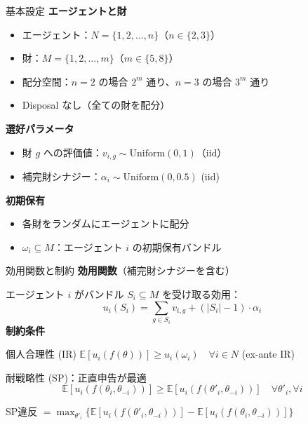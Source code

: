 \documentclass[aspectratio=169,12pt]{beamer}
\begin{document}
\begin{frame}{基本設定}
\textbf{エージェントと財}
\begin{itemize}
    \item エージェント：$N = \{1, 2, \ldots, n\}$（$n \in \{2, 3\}$）
    \item 財：$M = \{1, 2, \ldots, m\}$（$m \in \{5, 8\}$）
    \item 配分空間：$n = 2$ の場合 $2^m$ 通り、$n = 3$ の場合 $3^m$ 通り
    \item Disposal なし（全ての財を配分）
\end{itemize}

\vspace{0.3cm}
\textbf{選好パラメータ}
\begin{itemize}
    \item 財 $g$ への評価値：$v_{i,g} \sim \text{Uniform}(0, 1)$（iid）
    \item 補完財シナジー：$\alpha_i \sim \text{Uniform}(0, 0.5)$ (iid)
\end{itemize}

\vspace{0.3cm}
\textbf{初期保有}
\begin{itemize}
    \item 各財をランダムにエージェントに配分
    \item $\omega_i \subseteq M$：エージェント $i$ の初期保有バンドル
\end{itemize}
\end{frame}

\begin{frame}{効用関数と制約}
\textbf{効用関数}（補完財シナジーを含む）

エージェント $i$ がバンドル $S_i \subseteq M$ を受け取る効用：
\[
u_i(S_i) = \sum_{g \in S_i} v_{i,g} + (|S_i| - 1) \cdot \alpha_i
\]
\vspace{0.2cm}
\textbf{制約条件}
\begin{block}{個人合理性 (IR)}
$\mathbb{E}[u_i(f(\theta))] \geq u_i(\omega_i) \quad \forall i \in N$ \hfill (ex-ante IR)
\end{block}

\begin{block}{耐戦略性 (SP)：正直申告が最適}
\[
\mathbb{E}[u_i(f(\theta_i, \theta_{-i}))] \geq \mathbb{E}[u_i(f(\theta'_i, \theta_{-i}))] \quad \forall \theta'_i, \forall i
\]
\begin{center}
SP違反 $= \max_{\theta'_i} \{\mathbb{E}[u_i(f(\theta'_i, \theta_{-i}))] - \mathbb{E}[u_i(f(\theta_i, \theta_{-i}))]\}$
\end{center}
\end{block}
\end{frame}
\end{document}
